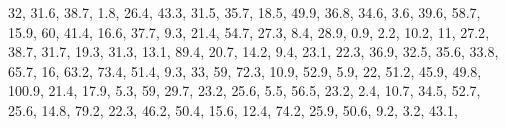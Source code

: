 \documentclass[]{book}
\newenvironment{Shaded}{\begin{snugshade}}{\end{snugshade}}
\newcommand{\DecValTok}[1]{\textcolor[rgb]{0.00,0.00,0.81}{#1}}
\newcommand{\FloatTok}[1]{\textcolor[rgb]{0.00,0.00,0.81}{#1}}
\newcommand{\NormalTok}[1]{#1}
\begin{document}
\begin{Shaded}
\begin{Highlighting}[]
    \DecValTok{32}\NormalTok{, }\FloatTok{31.6}\NormalTok{, }\FloatTok{38.7}\NormalTok{, }\FloatTok{1.8}\NormalTok{, }\FloatTok{26.4}\NormalTok{, }\FloatTok{43.3}\NormalTok{, }\FloatTok{31.5}\NormalTok{, }\FloatTok{35.7}\NormalTok{, }\FloatTok{18.5}\NormalTok{, }\FloatTok{49.9}\NormalTok{, }\FloatTok{36.8}\NormalTok{, }\FloatTok{34.6}\NormalTok{, }\FloatTok{3.6}\NormalTok{, }
    \FloatTok{39.6}\NormalTok{, }\FloatTok{58.7}\NormalTok{, }\FloatTok{15.9}\NormalTok{, }\DecValTok{60}\NormalTok{, }\FloatTok{41.4}\NormalTok{, }\FloatTok{16.6}\NormalTok{, }\FloatTok{37.7}\NormalTok{, }\FloatTok{9.3}\NormalTok{, }\FloatTok{21.4}\NormalTok{, }\FloatTok{54.7}\NormalTok{, }\FloatTok{27.3}\NormalTok{, }\FloatTok{8.4}\NormalTok{, }\FloatTok{28.9}\NormalTok{, }
    \FloatTok{0.9}\NormalTok{, }\FloatTok{2.2}\NormalTok{, }\FloatTok{10.2}\NormalTok{, }\DecValTok{11}\NormalTok{, }\FloatTok{27.2}\NormalTok{, }\FloatTok{38.7}\NormalTok{, }\FloatTok{31.7}\NormalTok{, }\FloatTok{19.3}\NormalTok{, }\FloatTok{31.3}\NormalTok{, }\FloatTok{13.1}\NormalTok{, }\FloatTok{89.4}\NormalTok{, }\FloatTok{20.7}\NormalTok{, }\FloatTok{14.2}\NormalTok{, }
    \FloatTok{9.4}\NormalTok{, }\FloatTok{23.1}\NormalTok{, }\FloatTok{22.3}\NormalTok{, }\FloatTok{36.9}\NormalTok{, }\FloatTok{32.5}\NormalTok{, }\FloatTok{35.6}\NormalTok{, }\FloatTok{33.8}\NormalTok{, }\FloatTok{65.7}\NormalTok{, }\DecValTok{16}\NormalTok{, }\FloatTok{63.2}\NormalTok{, }\FloatTok{73.4}\NormalTok{, }\FloatTok{51.4}\NormalTok{, }\FloatTok{9.3}\NormalTok{, }
    \DecValTok{33}\NormalTok{, }\DecValTok{59}\NormalTok{, }\FloatTok{72.3}\NormalTok{, }\FloatTok{10.9}\NormalTok{, }\FloatTok{52.9}\NormalTok{, }\FloatTok{5.9}\NormalTok{, }\DecValTok{22}\NormalTok{, }\FloatTok{51.2}\NormalTok{, }\FloatTok{45.9}\NormalTok{, }\FloatTok{49.8}\NormalTok{, }\FloatTok{100.9}\NormalTok{, }\FloatTok{21.4}\NormalTok{, }\FloatTok{17.9}\NormalTok{, }
    \FloatTok{5.3}\NormalTok{, }\DecValTok{59}\NormalTok{, }\FloatTok{29.7}\NormalTok{, }\FloatTok{23.2}\NormalTok{, }\FloatTok{25.6}\NormalTok{, }\FloatTok{5.5}\NormalTok{, }\FloatTok{56.5}\NormalTok{, }\FloatTok{23.2}\NormalTok{, }\FloatTok{2.4}\NormalTok{, }\FloatTok{10.7}\NormalTok{, }\FloatTok{34.5}\NormalTok{, }\FloatTok{52.7}\NormalTok{, }\FloatTok{25.6}\NormalTok{, }
    \FloatTok{14.8}\NormalTok{, }\FloatTok{79.2}\NormalTok{, }\FloatTok{22.3}\NormalTok{, }\FloatTok{46.2}\NormalTok{, }\FloatTok{50.4}\NormalTok{, }\FloatTok{15.6}\NormalTok{, }\FloatTok{12.4}\NormalTok{, }\FloatTok{74.2}\NormalTok{, }\FloatTok{25.9}\NormalTok{, }\FloatTok{50.6}\NormalTok{, }\FloatTok{9.2}\NormalTok{, }\FloatTok{3.2}\NormalTok{, }\FloatTok{43.1}\NormalTok{, }

\end{Highlighting}
\end{Shaded}
\end{document}
